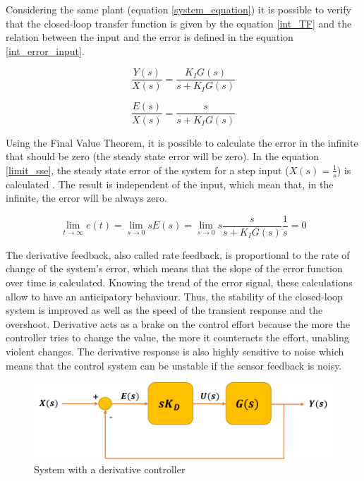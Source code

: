 Considering the same plant (equation \ref{system_equation}) it is possible to verify that the closed-loop transfer function is given by the equation \ref{int_TF} and the relation between the input and the error is defined in the equation \ref{int_error_input}.

\begin{equation}\label{int_TF}
\frac{Y(s)}{X(s)}= \frac{K_IG(s)}{s + K_IG(s)}
\end{equation}

\begin{equation}\label{int_error_input}
\frac{E(s)}{X(s)}= \frac{s}{s + K_IG(s)}
\end{equation}

Using the Final Value Theorem, it is possible to calculate the error in the infinite that should be zero (the steady state error will be zero). In the equation \ref{limit_sse}, the steady state error of the system for a step input ($X(s)=\frac{1}{s}$) is calculated . The result is independent of the input, which mean that, in the infinite, the error will be always zero.

\begin{equation}\label{limit_sse}
\lim_{t\to\infty} e(t) = \lim_{s \to 0} sE(s) = \lim_{s \to 0} s\frac{s}{s + K_IG(s)}\frac{1}{s} = 0
\end{equation}

\vspace{5mm}

The derivative feedback, also called rate feedback, is proportional to the rate of change of the system's error, which means that the slope of the error function over time is calculated. Knowing the trend of the error signal, these calculations allow to have an anticipatory behaviour. Thus, the stability of the closed-loop system is improved as well as the speed of the transient response and the overshoot. Derivative acts as a brake on the control effort because the more the controller tries to change the value, the more it counteracts the effort, unabling violent changes. The derivative response is also highly sensitive to noise which means that the control system can be unstable if the sensor feedback is noisy. 

\begin{figure}[H]
	\centering
	\includegraphics[scale=0.6]{figures/deriv_controller.png}
	\caption{System with a derivative controller}
	\label{deriv_controller}
\end{figure}

